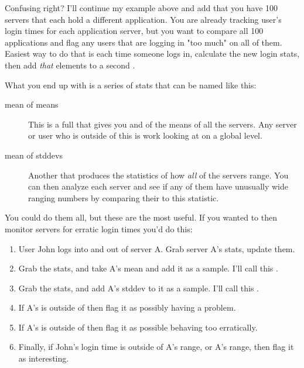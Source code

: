 Confusing right?  I'll continue my example above and add that you have 
100 servers that each hold a different application.  You are already
tracking user's login times for each application server, but you want to
compare all 100 applications and flag any users that are logging in "too much"
on all of them.  Easiest way to do that is each time someone logs in, calculate
the new login stats, then add \emph{that}  elements to
a second .

What you end up with is a series of stats that can be named like this:

\begin{description}
\item[mean of means]  This is a full  that gives you  and  of the means of all the servers.  Any server or user who is outside of this is work looking at on a global level.
\item[mean of stddevs] Another  that produces the statistics
    of how \emph{all} of the servers range.  You can then analyze each server and
    see if any of them have unusually wide ranging numbers by comparing their
     to this  statistic.
\end{description}

You could do them all, but these are the most useful.  If you wanted to then
monitor servers for erratic login times you'd do this:

\begin{enumerate}
\item User John logs into and out of server A.  Grab server A's stats, update them.
\item Grab the  stats, and take A's mean and add it as a sample.
    I'll call this .
\item Grab the  stats, and add A's stddev to it as a sample.
    I'll call this .
\item If A's  is outside of 
    then flag it as possibly having a problem.
\item If A's  is outside of 
    then flag it as possible behaving too erratically.
\item Finally, if John's login time is outside of A's range, or A's 
    range, then flag it as interesting.
\end{enumerate}

